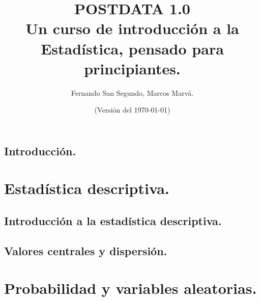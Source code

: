 \documentclass[10pt,a4paper]{book}
\begin{document}
\author{Fernando San Segundo, Marcos Marvá.}
\title{
\textcolor{\iftoggle{color}{blue}{black}}{\Huge POSTDATA 1.0}\\[5mm]
{\small Un curso de introducción a la Estadística, pensado para principiantes.}
}
\date{\small (Versión del \today)}

\VerbatimFootnotes

\pagestyle{plain}
\maketitle
\renewcommand{\thepage}{\roman{page}}%

\setcounter{tocdepth}{1}
\tableofcontents

\chapter*{Introducción.}



\pagestyle{empty}
\newpage

\setcounter{page}{0}%
\renewcommand{\thepage}{\arabic{page}}%

\part{Estadística descriptiva.}
\label{parte:EstadisticaDescriptiva}

\pagestyle{plain}



\chapter{Introducción a la estadística descriptiva.}
\label{cap:IntroduccionEstadisticaDescriptiva}


\chapter{Valores centrales y dispersión.}
\label{cap:ValoresCentralesDispersion}


\part{Probabilidad y variables aleatorias.}
\label{parte:ProbabilidadVariablesAleatorias}

\end{document}
